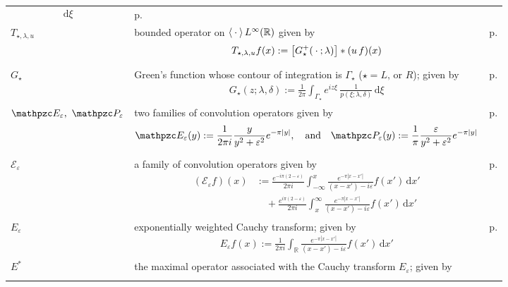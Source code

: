 \documentclass[../dissertation.tex]{subfiles}
\begin{document}
\begin{centering}
\begin{longtable}{R{.115\textwidth}|L{.74\textwidth}|C{.145\textwidth}}
{\begin{align*}
							\, \mathrm{d}\xi
				\end{align*}
			}
		& p.\pageref{sym:GFbndry} \\
	$T_{\star, \lambda, u}$ & bounded operator on 
		$\left\langle \kern 0.5ex \cdot \kern 0.5ex \right\rangle L^\infty(\mathbb R)$ given by
		{
		\begin{align*}
			T_{\star, \lambda, u} f(x) 
				:= \big[ G_\star^+(\kern 0.5ex \cdot \kern 0.5ex; \lambda) \big] * (u\,f)(x)
		\end{align*}
		}
		& p.\pageref{eqn2:Tdefn} \\
	$G_\star$ & Green's function whose contour of integration is $\Gamma_\star$ 
				($\star = L \text{, or } R$); given by 
				\begin{align*}
					G_\star(z; \lambda, \delta)
						:=
							\frac{1}{2\pi} 
							\int_{\Gamma_\star}
								e^{i z \xi} \,
								\frac{1}{p(\xi; \lambda, \delta)}
							\, \mathrm{d}\xi
				\end{align*}
		& p.\pageref{eq3:ILW.GFz} \\
	$\mathpzc E_\varepsilon, ~\mathpzc P_\varepsilon$ & two families of convolution
		operators given by
		\[
			\mathpzc E_\varepsilon(y)
				:= \frac{1}{2\pi i} \frac{y}{y^2 + \varepsilon^2} e^{-\pi|y|},
			\quad \text{and} \quad
			\mathpzc P_\varepsilon(y)
				:= \frac{1}{\pi} \frac{\varepsilon}{y^2 + \varepsilon^2} e^{-\pi|y|}
		\]
		& p.\pageref{sym:badCauchy} \\
	$\mathcal E_{\varepsilon}$ & a family of convolution operators
		given by
		{\begin{align*}
				\left( \mathcal E_\varepsilon f \right)(x)
				&:=  \frac{e^{-i \pi (2-\varepsilon)}}{2 \pi i}
					\int_{-\infty}^x
						\frac{e^{-\pi|x-x'|}}{(x-x') - i\varepsilon} f(x')
					\, \mathrm{d}x' \\
				&\quad + \frac{e^{i \pi (2-\varepsilon)}}{2 \pi i}
					\int_x^{\infty}
						\frac{e^{-\pi|x-x'|} }{(x-x') - i\varepsilon} f(x')
					\, \mathrm{d}x'
		\end{align*}}
		& p.\pageref{sym:almostExpCauchy} \\
	$E_{\varepsilon}$ & exponentially weighted Cauchy transform; given by
		\begin{align*}
			E_{\varepsilon} f(x)
				:= \frac{1}{2\pi i} \int_{\mathbb R}
					\frac{e^{-\pi|x-x'|}}{(x-x') - i \varepsilon} f(x') \, \mathrm{d}x'
		\end{align*}
		& p.\pageref{sym:expCauchy} \\
	$E^*$ & the maximal operator associated with the Cauchy transform
		$E_{\varepsilon}$; given by
		\begin{align*}

\end{align*}
\end{longtable}
\end{centering}
\end{document}
